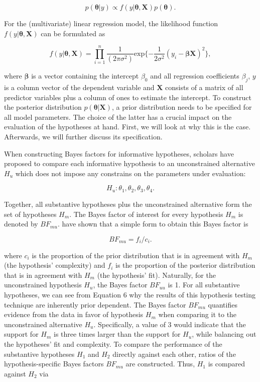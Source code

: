 \documentclass[11pt, a4paper]{article} %
\begin{document}
\begin{equation}
p(\bm{\theta}|y) \propto f(y|\bm{\theta,X}) p(\bm{\theta}).
\end{equation}

\noindent For the (multivariate) linear regression model, the likelihood function \\ $f(y|\bm{\theta, X})$ can be formulated as

\begin{equation}
f(y|\bm{\theta, X}) = \prod_{i=1}^{n} \frac{1}{(2\pi \sigma^2)} \text{exp} \{-\frac{1}{2\sigma^2} (y_i-\bm{\beta X})^2 \}, 
\end{equation}

\noindent where $\bm{\beta}$ is a vector containing the intercept $\beta_0$ and all regression coefficients $\beta_j$, $y$ is a column vector of the dependent variable and $\bm{X}$ consists of a matrix of all predictor variables plus a column of ones to estimate the intercept. To construct the posterior distribution $p(\bm{\theta}|\bm{X})$, a prior distribution needs to be specified for all model parameters. The choice of the latter has a crucial impact on the evaluation of the hypotheses at hand. First, we will look at why this is the case. Afterwards, we will further discuss its specification. 
 
When constructing Bayes factors for informative hypotheses, scholars have proposed to compare each informative hypothesis to an unconstrained alternative $H_u$ which does not impose any constrains on the parameters under evaluation:

\begin{equation}
H_u: \theta_1, \theta_2,\theta_3,\theta_4. 
\end{equation} 

\noindent Together, all substantive hypotheses plus the unconstrained alternative form the set of hypotheses $H_m$. The Bayes factor of interest for every hypothesis $H_m$ is denoted by $BF_{mu}$. \citet{Klugkist2005b} have shown that a simple form to obtain this Bayes factor is

\begin{equation}
BF_{mu} = f_i/c_i.
\end{equation}

\noindent where $c_i$ is the proportion of the prior distribution that is in agreement with $H_m$ (the hypothesis' complexity) and $f_i$ is the proportion of the posterior distribution that is in agreement with $H_m$ (the hypothesis' fit). Naturally, for the unconstrained hypothesis $H_u$, the Bayes factor $BF_{uu}$ is 1. For all substantive hypotheses, we can see from Equation 6 why the results of this hypothesis testing technique are inherently prior dependent. The Bayes factor $BF_{mu}$ quantifies evidence from the data in favor of hypothesis $H_m$ when comparing it to the unconstrained alternative $H_u$. Specifically, a value of 3 would indicate that the support for $H_m$ is three times larger than the support for $H_u$, while balancing out the hypotheses' fit and complexity. To compare the performance of the substantive hypotheses $H_1$ and $H_2$ directly against each other, ratios of the hypothesis-specific Bayes factors $BF_{mu}$ are constructed. Thus, $H_1$ is compared against $H_2$ via 
\end{document}
